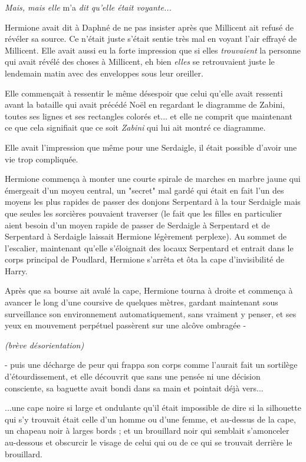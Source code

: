 \emph{Mais, mais elle } m'a \emph{dit qu'elle était voyante...} 

Hermione avait dit à Daphné de ne pas insister après que Millicent ait refusé de révéler sa source. Ce n'était juste s'était sentie très mal en voyant l'air effrayé de Millicent. Elle avait aussi eu la forte impression que si elles \emph{trouvaient}  la personne qui avait révélé des choses à Millicent, eh bien \emph{elles}  se retrouvaient juste le lendemain matin avec des enveloppes sous leur oreiller.

Elle commençait à ressentir le même désespoir que celui qu'elle avait ressenti avant la bataille qui avait précédé Noël en regardant le diagramme de Zabini, toutes ses lignes et ses rectangles colorés et... et elle ne comprit que maintenant ce que cela signifiait que ce soit \emph{Zabini}  qui lui ait montré ce diagramme.

Elle avait l'impression que même pour une Serdaigle, il était possible d'avoir une vie trop compliquée.

Hermione commença à monter une courte spirale de marches en marbre jaune qui émergeait d'un moyeu central, un "secret" mal gardé qui était en fait l'un des moyens les plus rapides de passer des donjons Serpentard à la tour Serdaigle mais que seules les sorcières pouvaient traverser (le fait que les filles en particulier aient besoin d'un moyen rapide de passer de Serdaigle à Serpentard et de Serpentard à Serdaigle laissait Hermione légèrement perplexe). Au sommet de l'escalier, maintenant qu'elle s'éloignait des locaux Serpentard et entrait dans le corps principal de Poudlard, Hermione s'arrêta et ôta la cape d'invisibilité de Harry.

Après que sa bourse ait avalé la cape, Hermione tourna à droite et commença à avancer le long d'une coursive de quelques mètres, gardant maintenant sous surveillance son environnement automatiquement, sans vraiment y penser, et ses yeux en mouvement perpétuel passèrent sur une alcôve ombragée -

\emph{(brève désorientation)} 

- puis une décharge de peur qui frappa son corps comme l'aurait fait un sortilège d'étourdissement, et elle découvrit que sans une pensée ni une décision consciente, sa baguette avait bondi dans sa main et pointait déjà vers...

...une cape noire si large et ondulante qu'il était impossible de dire si la silhouette qui s'y trouvait était celle d'un homme ou d'une femme, et au-dessus de la cape, un chapeau noir à larges bords ; et un brouillard noir qui semblait s'amonceler au-dessous et obscurcir le visage de celui qui ou de ce qui se trouvait derrière le brouillard.

